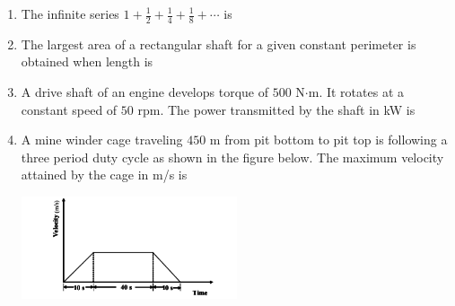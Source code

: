 \documentclass[journal]{IEEEtran}
\begin{document}
\begin{enumerate}
\item The infinite series $1 + \frac{1}{2} + \frac{1}{4} + \frac{1}{8} + \cdots$ is
\begin{enumerate}
\end{enumerate}

\item The largest area of a rectangular shaft for a given constant perimeter is obtained when length is
\begin{enumerate}
\end{enumerate}

\item A drive shaft of an engine develops torque of $500$ N$\cdot$m. It rotates at a constant speed of $50$ rpm. The power transmitted by the shaft in kW is
\begin{enumerate}
\end{enumerate}

\item A mine winder cage traveling $450$ m from pit bottom to pit top is following a three period duty cycle as shown in the figure below. The maximum velocity attained by the cage in m/s is

\begin{center}
\includegraphics[width=0.5\textwidth]{Screenshot_2025_0813_160511.png} 
\end{center}


\end{enumerate}
\end{document}
